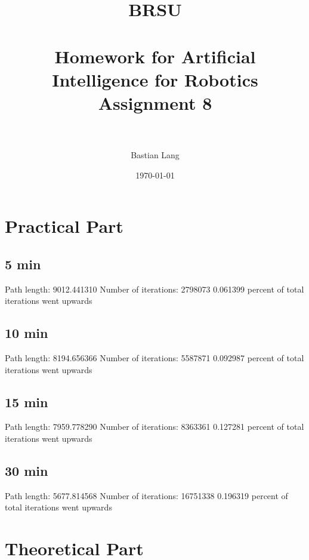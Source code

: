 \documentclass[paper=a4, fontsize=11pt]{scrartcl} %
\title{	
\normalfont \normalsize 
\textsc{BRSU} \\ [25pt] %
\horrule{0.5pt} \\[0.4cm] %
\huge Homework for Artificial Intelligence for Robotics\\Assignment 8 \\ %
\horrule{2pt} \\[0.5cm] %
}
\author{Bastian Lang} %
\date{\normalsize\today} %
\numberwithin{equation}{section} %
\numberwithin{figure}{section} %
\numberwithin{table}{section} %
\begin{document}
\maketitle %

\section{Practical Part}
\subsection{5 min}
Path length: 9012.441310
Number of iterations: 2798073
0.061399 percent of total iterations went upwards

\subsection{10 min}
Path length: 8194.656366
Number of iterations: 5587871
0.092987 percent of total iterations went upwards

\subsection{15 min}
Path length: 7959.778290
Number of iterations: 8363361
0.127281 percent of total iterations went upwards

\subsection{30 min}
Path length: 5677.814568
Number of iterations: 16751338
0.196319 percent of total iterations went upwards


\section{Theoretical Part}
\end{document}

